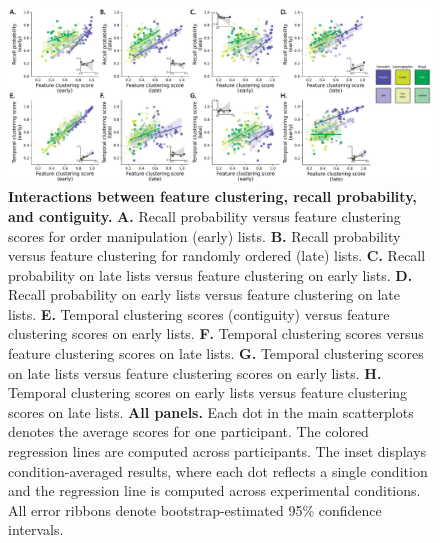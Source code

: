 \documentclass[11pt]{article}
\begin{document}
\begin{figure}[tp] \centering
    \includegraphics[width=\textwidth]{figures/feature_clustering_vs_accuracy_and_contiguity}

    \caption{\textbf{Interactions between feature clustering, recall probability,
    and contiguity.} \textbf{A.} Recall probability versus feature clustering
    scores for order manipulation (early) lists. \textbf{B.} Recall probability
    versus feature clustering for randomly ordered (late) lists. \textbf{C.} Recall
    probability on late lists versus feature clustering on early lists. \textbf{D.}
    Recall probability on early lists versus feature clustering on late lists.
    \textbf{E.} Temporal clustering scores (contiguity) versus feature clustering
    scores on early lists. \textbf{F.} Temporal clustering scores versus feature
    clustering scores on late lists. \textbf{G.} Temporal clustering scores on late
    lists versus feature clustering scores on early lists. \textbf{H.} Temporal
    clustering scores on early lists versus feature clustering scores on late
    lists. \textbf{All panels.} Each dot in the main scatterplots denotes the
    average scores for one participant. The colored regression lines are computed
    across participants. The inset displays condition-averaged results, where each
    dot reflects a single condition and the regression line is computed across
    experimental conditions. All error ribbons denote bootstrap-estimated 95\%
    confidence intervals.} \label{fig:clustering-scatterplots} 

\end{figure}
\end{document}
